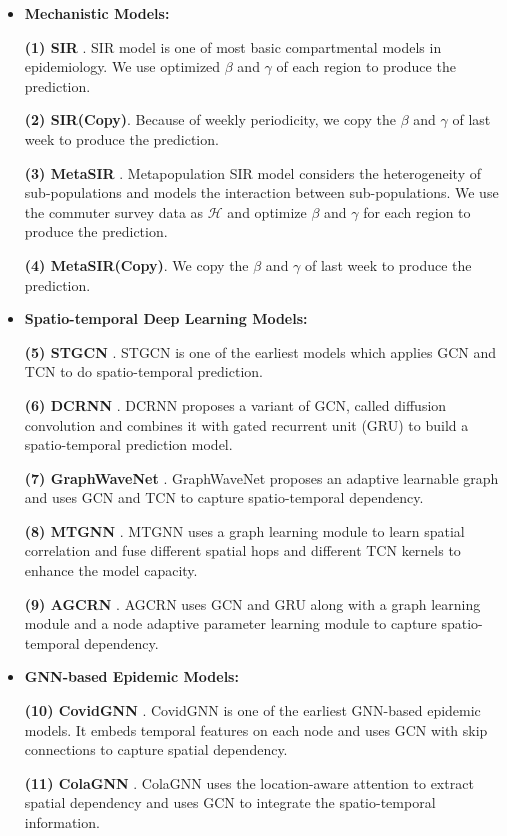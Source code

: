 \documentclass[lettersize,journal]{IEEEtran}
\begin{document}
\begin{itemize}
    \item \noindent\textbf{Mechanistic Models:}
    
    \textbf{(1) SIR} \cite{ref_11}. SIR model is one of most basic compartmental models in epidemiology. We use optimized $\beta$ and $\gamma$ of each region to produce the prediction.

    \textbf{(2) SIR(Copy)}. Because of weekly periodicity, we copy the $\beta$ and $\gamma$ of last week to produce the prediction. 
    
    \textbf{(3) MetaSIR} \cite{ref_2}. Metapopulation SIR model considers the heterogeneity of sub-populations and models the interaction between sub-populations. We use the commuter survey data as $\mathcal H$ and optimize $\beta$ and $\gamma$ for each region to produce the prediction. 
    
    \textbf{(4) MetaSIR(Copy)}. We copy the $\beta$ and $\gamma$ of last week to produce the prediction. 

    \item\noindent\textbf{Spatio-temporal Deep Learning Models:} 
    
    \textbf{(5) STGCN} \cite{ref_21}. STGCN is one of the earliest models which applies GCN and TCN to do spatio-temporal prediction. 
    
    \textbf{(6) DCRNN} \cite{ref_22}. DCRNN proposes a variant of GCN, called diffusion convolution and combines it with gated recurrent unit (GRU) to build a spatio-temporal prediction model. 
    
    \textbf{(7) GraphWaveNet} \cite{ref_23}. GraphWaveNet proposes an adaptive learnable graph and uses GCN and TCN to capture spatio-temporal dependency.  
    
    \textbf{(8) MTGNN} \cite{ref_26}. MTGNN uses a graph learning module to learn spatial correlation and fuse different spatial hops and different TCN kernels to enhance the model capacity. 
    
    \textbf{(9) AGCRN} \cite{ref_27}. AGCRN uses GCN and GRU along with a graph learning module and a node adaptive parameter learning module to capture spatio-temporal dependency.
    
    
    \item\noindent\textbf{GNN-based Epidemic Models:} 
    
    \textbf{(10) CovidGNN} \cite{ref_10}. CovidGNN is one of the earliest GNN-based epidemic models. It embeds temporal features on each node and uses GCN with skip connections to capture spatial dependency. 
    
    \textbf{(11) ColaGNN} \cite{ref_9}. ColaGNN uses the location-aware attention to extract spatial dependency and uses GCN to integrate the spatio-temporal information.

\end{itemize}
\end{document}
